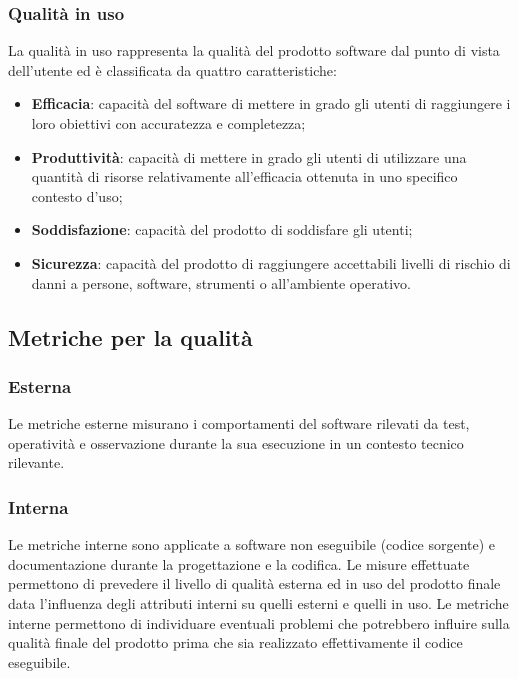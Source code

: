 \documentclass[../PianoDiQualifica.tex]{subfiles}
\begin{document}
			\subsubsection{Qualità in uso}
				La qualità in uso rappresenta la qualità del prodotto software dal punto di vista
				dell'utente ed è classificata da quattro caratteristiche:
				\begin{itemize}
					\item \textbf{Efficacia}: capacità del software di mettere in grado gli utenti di
					raggiungere i loro obiettivi con accuratezza e completezza;
					\item \textbf{Produttività}: capacità di mettere in grado gli utenti di utilizzare
					una quantità di risorse relativamente all'efficacia ottenuta in uno specifico
					contesto d'uso;
					\item \textbf{Soddisfazione}: capacità del prodotto di soddisfare gli utenti;
					\item \textbf{Sicurezza}: capacità del prodotto di raggiungere accettabili livelli
					di rischio di danni a persone, software, strumenti o all'ambiente operativo.
				\end{itemize}
		\subsection{Metriche per la qualità}
			\subsubsection{Esterna}
				Le metriche esterne misurano i comportamenti del software rilevati da test, operatività
				e osservazione durante la sua esecuzione in un contesto tecnico rilevante.
			\subsubsection{Interna}
				Le metriche interne sono applicate a software non eseguibile (codice sorgente) e 
				documentazione durante la progettazione e la codifica. Le misure effettuate permettono
				di prevedere il livello di qualità esterna ed in uso del prodotto finale data
				l'influenza degli attributi interni su quelli esterni e quelli in uso.
				Le metriche interne permettono di individuare eventuali problemi che potrebbero
				influire sulla qualità finale del prodotto prima che sia realizzato effettivamente
				il codice eseguibile.
\end{document}
